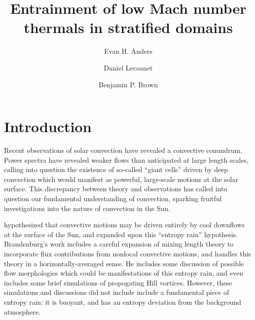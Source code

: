 \documentclass[twocolumn, amsmath, amsfonts, amssymb, trackchanges]{aastex62}
\begin{document}
\title{Entrainment of low Mach number thermals in stratified domains}


\author[0000-0002-3433-4733]{Evan H. Anders}
\author[0000-0002-7635-9728]{Daniel Lecoanet}
\author[0000-0001-8935-219X]{Benjamin P. Brown}


\begin{abstract}
\end{abstract}


\section{Introduction}
\label{sec:intro}
Recent observations of solar convection have revealed a convective conundrum.
Power spectra have revealed weaker flows than anticipated at large length scales,
calling into question the existence of so-called ``giant cells'' driven by deep
convection which would manifest as powerful, large-scale motions at the solar
surface. This discrepancy between theory and observations has called into question
our fundamental understanding of convection, sparking fruitful investigations into
the nature of convection in the Sun.

\cite{spruit1997} hypothesized that convective motions may be driven entirely by
cool downflows at the surface of the Sun, and \citet{brandenburg2016} expanded
upon this ``entropy rain'' hypothesis. Brandenburg's work includes a careful
expansion of mixing length theory to incorporate flux contributions from nonlocal
convective motions, and handles this theory in a horizontally-averaged sense.
He includes some discussion of possible flow morphologies which could be manifestations
of this entropy rain, and even includes some brief simulations of propogating
Hill vortices. However, these simulations and discussions did not include 
include a fundamental piece of entropy rain: it is buoyant, and has an entropy
deviation from the background atmosphere.
\end{document}
